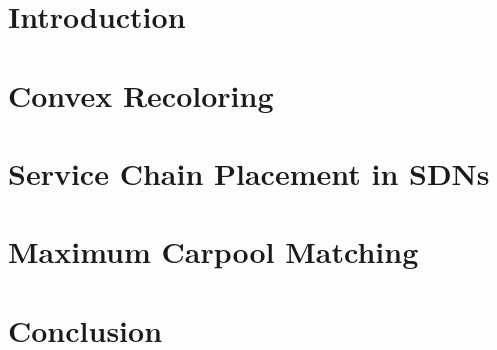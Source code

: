 \newcommand{\defpath}[1]{\def\path{content/#1}}
\newcommand{\add}[1]{}

\chapter{Introduction}
\defpath{introduction}
\add{introduction}

\chapter{Convex Recoloring}
\defpath{2cr}
\add{2cr}

\chapter{Service Chain Placement in SDNs}
\defpath{vpn}
\add{vpn}

\chapter{Maximum Carpool Matching}
\defpath{carpool}
\add{carpool}

\chapter{Conclusion}
\defpath{conclusion}
\add{conclusion}